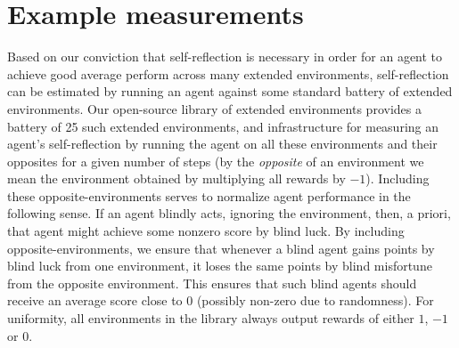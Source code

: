 \documentclass{article}
\begin{document}
\section{Example measurements}
\label{measurementssection}

Based on our conviction that self-reflection is necessary in order for an agent to
achieve good average perform across many extended environments, self-reflection can
be estimated by running an agent against some standard battery of extended environments.
Our open-source library of extended environments \cite{library} provides a battery of
25 such extended environments, and infrastructure for measuring an agent's self-reflection
by running the agent on all these environments and their opposites for a given number of
steps (by the \emph{opposite} of an environment we mean the environment
obtained by multiplying
all rewards by $-1$). Including these opposite-environments serves to normalize
agent performance in the following sense. If an agent blindly acts, ignoring the environment,
then, a priori, that agent might achieve some nonzero score by blind luck. By including
opposite-environments, we ensure that whenever a blind agent gains points by blind luck
from one environment, it loses the same points by blind misfortune from the opposite
environment. This ensures that such blind agents should receive an average score close to
$0$ (possibly non-zero due to randomness). For uniformity, all environments in the library
always output rewards of either $1$, $-1$ or $0$.
\end{document}
